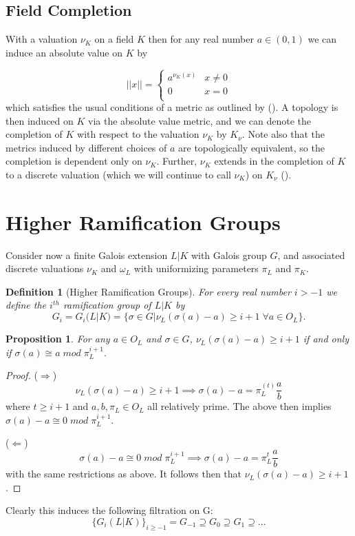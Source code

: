 \documentclass[paper=a4, fontsize=11pt]{scrartcl} %
\numberwithin{equation}{section} %
\numberwithin{figure}{section} %
\numberwithin{table}{section} %
\theoremstyle{break}
\newtheorem{defn}{Definition}
\newtheorem{prop}{Proposition}
\begin{document}
\subsection{Field Completion}
With a valuation $\nu_K$ on a field $K$ then for any real number $a\in(0,1)$ we can induce an absolute value on $K$ by

\[ ||x|| =  \begin{cases} 
      a^{\nu_K(x)} & x \not= 0 \\
      0 & x = 0 \\
   \end{cases}
\]
which satisfies the usual conditions of a metric as outlined by (\cite{Serre}). A topology is then induced on $K$ via the absolute value metric, and we can denote the completion of $K$ with respect to the valuation $\nu_K$ by $K_\nu$. Note also that the metrics induced by different choices of $a$ are topologically equivalent, so the completion is dependent only on $\nu_K$. Further, $\nu_K$ extends in the completion of $K$ to a discrete valuation (which we will continue to call $\nu_K$) on $K_\nu$ (\cite{Serre}).

\section{Higher Ramification Groups}
Consider now a finite Galois extension $L|K$ with Galois group $G$, and associated discrete valuations $\nu_K$ and $\omega_L$ with uniformizing parameters $\pi_L$ and $\pi_K$.

\begin{defn}[Higher Ramification Groups]
For every real number $i > -1$ we define the $i^{th}$ ramification group of $L|K$ by
$$
G_i = G_i(L|K) = \{\sigma \in G | \nu_L(\sigma(a)-a)\geq i+1 \;\forall a \in O_L\}.
$$
\end{defn}

\begin{prop}
For any $a \in O_L$ and $\sigma \in G$, $\nu_L(\sigma(a) - a) \geq i+1$ if and only if  $\sigma(a) \cong a \; mod \; \pi_L^{i+1}$.
\end{prop}
\begin{proof}

($\Rightarrow$)
$$
\nu_L(\sigma(a)-a) \geq i+1 \implies \sigma(a)-a = \pi_L^(t)\frac{a}{b}
$$
where $t \geq i+1$ and $a,b,\pi_L\in O_L$ all relatively prime. The above then implies $\sigma(a)-a \cong 0 \; mod \; \pi_L^{i+1}$.

($\Leftarrow$) $$\sigma(a)-a \cong 0 \; mod \; \pi_L^{i+1} \implies \sigma(a)-a = \pi_L^{t}\frac{a}{b}$$
with the same restrictions as above. It follows then that $\nu_L(\sigma(a)-a) \geq i+1$.
\end{proof}
Clearly this induces the following filtration on G:
$$
\{G_i(L|K)\}_{i\geq -1} = G_{-1} \supseteq G_0 \supseteq G_1 \supseteq \ldots
$$
\end{document}
